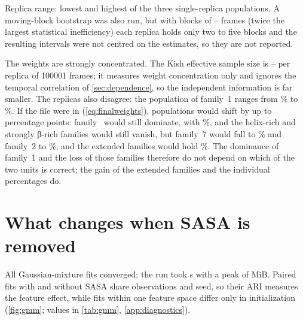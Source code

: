 \begin{table}[htbp]
\centering
\begin{threeparttable}
\caption{Raw frame fractions and weighted populations of the density-peak families (\%), under the assumed \kJmol{} unit and, for comparison, if the file were in \kcalmol{}.}
\label{tab:weighted}
\small
\begin{tablenotes}[flushleft]\footnotesize\raggedright
\item Replica range: lowest and highest of the three single-replica populations. A moving-block bootstrap was also run, but with blocks of \WBlockMin--\WBlockMax{} frames (twice the largest statistical inefficiency) each replica holds only two to five blocks and the resulting intervals were not centred on the estimates, so they are not reported.
\end{tablenotes}
\end{threeparttable}
\end{table}

The weights are strongly concentrated. The Kish effective sample size is \WKishMin--\WKishMax{} per replica of \num{100001} frames; it measures weight concentration only and ignores the temporal correlation of \cref{sec:dependence}, so the independent information is far smaller. The replicas also disagree: the population of family~1 ranges from \WTopRepMin\% to \WTopRepMax\%. If the file were in \kcalmol{} (\cref{eq:finalweights}), populations would shift by up to \WUnitShift{} percentage points: family~\WTopKcal{} would still dominate, with \WTopKcalShare\%, and the helix-rich and strongly β-rich families would still vanish, but family~7 would fall to \WFamSevenKcal\% and family~2 to \WFamTwoKcal\%, and the extended families would hold \WExtendedKcal\%. The dominance of family~1 and the loss of those families therefore do not depend on which of the two units is correct; the gain of the extended families and the individual percentages do.

\section{What changes when SASA is removed}
\label{sec:sasaremoval}
All \GMMModels{} Gaussian-mixture fits converged; the run took \GMMSeconds{} s with a peak of \GMMMemory{} MiB. Paired fits with and without SASA share observations and seed, so their ARI measures the feature effect, while fits within one feature space differ only in initialization (\cref{fig:gmm}; values in \cref{tab:gmm}, \cref{app:diagnostics}).

